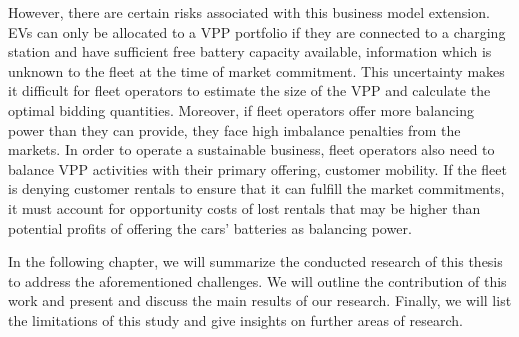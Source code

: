 \documentclass[a4paper, 12pt]{article}
\begin{document}
However, there are certain risks associated with this business model extension.
EVs can only be allocated to a VPP portfolio if they are connected to a charging
station and have sufficient free battery capacity available, information which
is unknown to the fleet at the time of market commitment. This uncertainty makes
it difficult for fleet operators to estimate the size of the VPP and calculate
the optimal bidding quantities. Moreover, if fleet operators offer more
balancing power than they can provide, they face high imbalance penalties from
the markets. In order to operate a sustainable business, fleet operators also
need to balance VPP activities with their primary offering, customer mobility.
If the fleet is denying customer rentals to ensure that it can fulfill the
market commitments, it must account for opportunity costs of lost rentals that
may be higher than potential profits of offering the cars' batteries as
balancing power.

In the following chapter, we will summarize the conducted research of this
thesis to address the aforementioned challenges. We will outline the
contribution of this work and present and discuss the main results of our
research. Finally, we will list the limitations of this study and give insights
on further areas of research.
\end{document}
